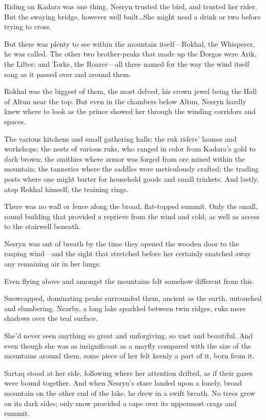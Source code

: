 Riding on Kadara was one thing.
Nesryn trusted the bird, and trusted her rider.
But the swaying bridge, however well built\ldots She might need a drink or two before trying to cross.

But there was plenty to see within the mountain itself---Rokhal, the Whisperer, he was called.
The other two brother-peaks that made up the Dorgos were Arik, the Lilter; and Torke, the Roarer---all three named for the way the wind itself sang as it passed over and around them.

Rokhal was the biggest of them, the most delved, his crown jewel being the Hall of Altun near the top.
But even in the chambers below Altun, Nesryn hardly knew where to look as the prince showed her through the winding corridors and spaces.

The various kitchens and small gathering halls; the ruk riders' houses and workshops; the nests of various ruks, who ranged in color from Kadara's gold to dark brown; the smithies where armor was forged from ore mined within the mountain; the tanneries where the saddles were meticulously crafted; the trading posts where one might barter for household goods and small trinkets.
And lastly, atop Rokhal himself, the training rings.

There was no wall or fence along the broad, flat-topped summit.
Only the small, round building that provided a reprieve from the wind and cold, as well as access to the stairwell beneath.

Nesryn was out of breath by the time they opened the wooden door to the rasping wind---and the sight that stretched before her certainly snatched away any remaining air in her lungs.

Even flying above and amongst the mountains felt somehow different from this.

Snowcapped, dominating peaks surrounded them, ancient as the earth, untouched and slumbering.
Nearby, a long lake sparkled between twin ridges, ruks mere shadows over the teal surface.

She'd never seen anything so great and unforgiving, so vast and beautiful.
And even though she was as insignificant as a mayfly compared with the size of the mountains around them, some piece of her felt keenly a part of it, born from it.

Sartaq stood at her side, following where her attention drifted, as if their gazes were bound together.
And when Nesryn's stare landed upon a lonely, broad mountain on the other end of the lake, he drew in a swift breath.
No trees grew on its dark sides; only snow provided a cape over its uppermost crags and summit.

